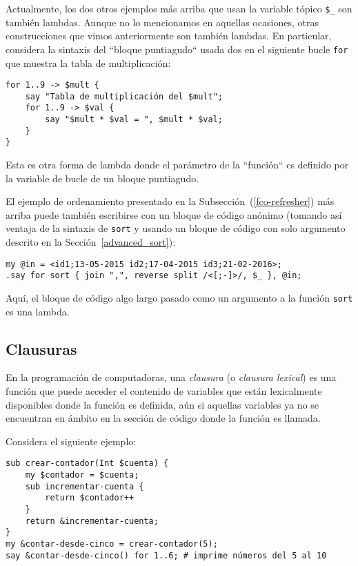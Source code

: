 Actualmente, los dos otros ejemplos más arriba que usan
la variable tópico \verb|$_| son también lambdas. Aunque 
no lo mencionamos en aquellas ocasiones, otras construcciones
que vimos anteriormente son también lambdas. En particular,
considera la sintaxis del ``bloque puntiagudo`` usada dos
en el siguiente bucle {\tt for} que muestra la tabla de 
multiplicación:

\begin{verbatim}
for 1..9 -> $mult {
    say "Tabla de multiplicación del $mult";
    for 1..9 -> $val {
        say "$mult * $val = ", $mult * $val;
    }
}
\end{verbatim}

Esta es otra forma de lambda donde el parámetro de la ``función``
es definido por la variable de bucle de un bloque puntiagudo.

El ejemplo de ordenamiento presentado en la Subsección~(\ref{fco-refresher})
más arriba puede también escribirse con un bloque de código anónimo
(tomando así ventaja de la sintaxis de {\tt sort}
y usando un bloque de código con solo argumento descrito en la 
Sección~\ref{advanced_sort}):
\begin{verbatim}
my @in = <id1;13-05-2015 id2;17-04-2015 id3;21-02-2016>;
.say for sort { join ",", reverse split /<[;-]>/, $_ }, @in;
\end{verbatim}

Aquí, el bloque de código algo largo pasado como un argumento
a la función {\tt sort} es una lambda.


\subsection{Clausuras}

En la programación de computadoras, una \emph{clausura} 
(o \emph{clausura lexical}) es una función que puede acceder
el contenido de variables que están lexicalmente disponibles
donde la función es definida, aún si aquellas variables ya no
se encuentran en ámbito en la sección de código donde la
función es llamada.

Considera el siguiente ejemplo:

\begin{verbatim}
sub crear-contador(Int $cuenta) {
    my $contador = $cuenta;
    sub incrementar-cuenta {
        return $contador++
    }
    return &incrementar-cuenta;
}
my &contar-desde-cinco = crear-contador(5);
say &contar-desde-cinco() for 1..6; # imprime números del 5 al 10
\end{verbatim}

